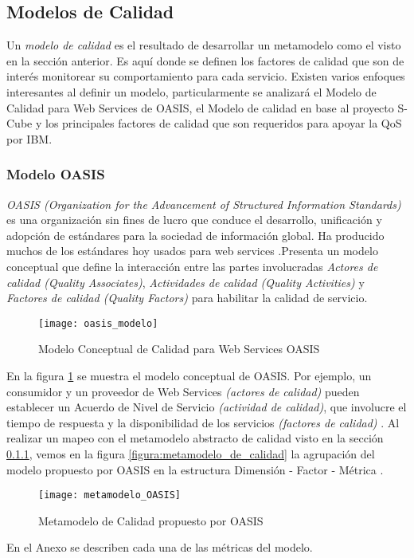 \subsection{Modelos de Calidad}
\label{MarcoConceptual:modelos_calidad}
Un \emph{modelo de calidad} es el resultado de desarrollar un metamodelo como el visto en la sección anterior. Es aquí donde se definen los factores de calidad que son de interés monitorear su comportamiento para cada servicio. Existen varios enfoques interesantes al definir un modelo, particularmente se analizará el Modelo de Calidad para Web Services de OASIS, el Modelo de calidad en base al proyecto S-Cube y los principales factores de calidad que son requeridos para apoyar la QoS por IBM.
\subsubsection{Modelo OASIS}
\label{MarcoConceptual:modelo_OASIS}
\emph{OASIS (Organization for the Advancement of Structured Information Standards)} es una organización sin fines de lucro que conduce el desarrollo, unificación y adopción de estándares para la sociedad de información global. Ha producido muchos de los estándares hoy usados para web services \cite{OASIS:def}.Presenta un modelo conceptual que define la interacción entre las partes involucradas \emph{Actores de calidad (Quality Associates)}, \emph{Actividades de calidad (Quality Activities)} y \emph{Factores de calidad (Quality Factors)} para habilitar la calidad de servicio.
  \begin{figure}[h]
    \centering
    \texttt{[image: oasis\_modelo]}
    \caption{Modelo Conceptual de Calidad para Web Services OASIS}
    \label{figura:oasis_modelo}
  \end{figure}
En la figura \ref{figura:oasis_modelo} se muestra el modelo conceptual de OASIS. Por ejemplo, un consumidor y un proveedor de Web Services \emph{(actores de calidad)} pueden establecer un Acuerdo de Nivel de Servicio \emph{(actividad de calidad)}, que involucre el tiempo de respuesta y la disponibilidad de los servicios \emph{(factores de calidad)} \cite{Tesis:LauraGonzalez:PlataformaESB}.
Al realizar un mapeo con el metamodelo abstracto de calidad visto en la sección \ref{MarcoConceptual:modelo_OASIS}, vemos en la figura \ref{figura:metamodelo_de_calidad} la agrupación del modelo propuesto por OASIS en la estructura Dimensión - Factor - Métrica \cite{Articulo:LauraGonzalez:CalidadWS}.
  \begin{figure}[h]
    \centering
    \texttt{[image: metamodelo\_OASIS]}
    \caption{Metamodelo de Calidad propuesto por OASIS}
    \label{figura:metamodelo_OASIS}
  \end{figure}
En el Anexo se describen cada una de las métricas del modelo.

